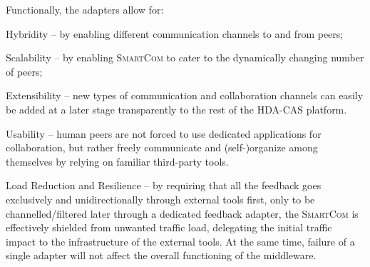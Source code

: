 \documentclass{llncs}
\newcommand{\mdl}{\textsc{SmartCom}}
\newcommand{\figfloat}[3][0.9]{
\begin{figure}[h] 
\centering
\texttt{[image: figures/\#2]}
\caption{#3}
\label{fig:#2}
\end{figure}
}
\begin{document}
    Functionally, the adapters allow for:
    \begin{inparaenum}[\itshape a)]
    \item Hybridity -- by enabling different communication channels to and from peers;
    \item Scalability -- by enabling \mdl{} to cater to the dynamically changing number of peers;
    \item Extensibility -- new types of communication and collaboration channels can easily be added at a later stage transparently to the rest of the HDA-CAS platform.
    \item Usability -- human peers are not forced to use dedicated applications for collaboration, but rather freely communicate and (self-)organize among themselves by relying on familiar third-party tools.
    \item Load Reduction and Resilience -- by requiring that all the feedback goes exclusively and unidirectionally through external tools first, only to be channelled/filtered later through a dedicated feedback adapter, the \mdl{} is effectively shielded from unwanted traffic load, delegating the initial traffic impact to the infrastructure of the external tools. At the same time, failure of a single adapter will not affect the overall functioning of the middleware.
    \end{inparaenum}


\end{document}
